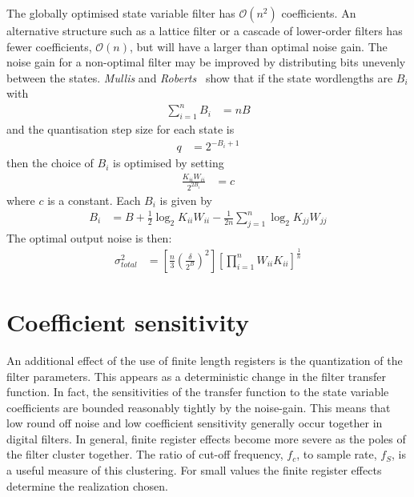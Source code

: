 \documentclass[a4paper,twoside,10pt,english]{report}
\begin{document}
The globally optimised state variable filter has
$\mathcal{O}\left(n^{2}\right)$
coefficients. An alternative structure such as a lattice filter or a cascade of
lower-order filters has fewer coefficients, $\mathcal{O}\left(n\right)$, but
will have a larger than optimal noise gain. The noise gain for a non-optimal
filter may be improved by distributing bits unevenly between the states.
\emph{Mullis} and \emph{Roberts}~\cite[Section IV]{MullisRoberts_SynthesisMinimumRoundoffNoiseDigitalFilters}
show that if the state wordlengths are $B_{i}$ with
\begin{align*}
\sum^{n}_{i=1}B_{i} &= nB
\end{align*}
and the quantisation step size for each state is
\begin{align*}
  q &= 2^{-B_{i}+1}
\end{align*}
then the choice of $B_{i}$ is optimised by setting
\begin{align*}
  \frac{K_{ii}W_{ii}}{2^{2B_{i}}} &= c
\end{align*}
where $c$ is a constant. Each $B_{i}$ is given by
\begin{align}
  \label{eqn:Optimal-roundoff-noise-bit-distribution}
  B_{i} &= B + \frac{1}{2}\log_{2}K_{ii}W_{ii} -
  \frac{1}{2n}\sum_{j=1}^{n}\log_{2}K_{jj}W_{jj}
\end{align}
The optimal output noise is then:
\begin{align*}
  \sigma_{total}^{2} &=
  \left[ \frac{n}{3}\left(\frac{\delta}{2^{B}}\right)^{2}\right]
  \left[ \prod^{n}_{i=1}W_{ii}K_{ii}\right]^{\frac{1}{n}}
\end{align*}

\section{Coefficient sensitivity}
An additional effect of the use of finite length registers
is the quantization of the filter parameters. This appears as a deterministic
change in the filter transfer function. In fact, the sensitivities
of the transfer function to the state variable coefficients are bounded
reasonably tightly by the noise-gain. This means that low round off
noise and low coefficient sensitivity generally occur together in
digital filters. In general, finite register effects become more severe
as the poles of the filter cluster together. The ratio of cut-off
frequency, $f_{c}$, to sample rate, $f_{S}$,
is a useful measure of this clustering. For small values the finite
register effects determine the realization chosen.
\end{document}
